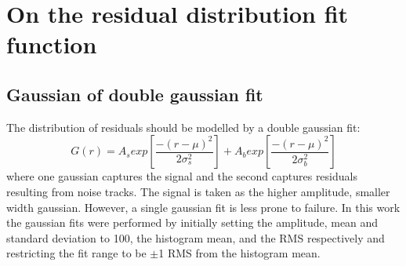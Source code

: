 \chapter[Residual distribution fit function]{On the residual distribution fit function}
\label{appendix-double_gaussian}

\section{Gaussian of double gaussian fit}

The distribution of residuals should be modelled by a double gaussian fit:
$$ G(r) = A_{s}exp\left[ \frac{-(r-\mu)^{2}}{2\sigma_s^{2}} \right] + A_{b}exp\left[ \frac{-(r-\mu)^{2}}{2\sigma_b^{2}} \right]$$
where one gaussian captures the signal and the second captures residuals resulting from noise tracks. The signal is taken as the higher amplitude, smaller width gaussian. However, a single gaussian fit is less prone to failure. In this work the gaussian fits were performed by initially setting the amplitude, mean and standard deviation to 100, the histogram mean, and the RMS respectively and restricting the fit range to be $\pm$1 RMS from the histogram mean. 